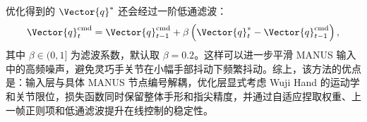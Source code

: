 优化得到的 $\Vector{q}^{*}$ 还会经过一阶低通滤波：
\begin{equation}
    \Vector{q}^{\mathrm{cmd}}_t =
    \Vector{q}^{\mathrm{cmd}}_{t-1}
    +\beta\left(
        \Vector{q}^{*}_t-
        \Vector{q}^{\mathrm{cmd}}_{t-1}
    \right),
\end{equation}
其中 $\beta\in(0,1]$ 为滤波系数，默认取 $\beta=0.2$。这样可以进一步平滑 MANUS 输入中的高频噪声，避免灵巧手关节在小幅手部抖动下频繁抖动。综上，该方法的优点是：输入层与具体 MANUS 节点编号解耦，优化层显式考虑 Wuji Hand 的运动学和关节限位，损失函数同时保留整体手形和指尖精度，并通过自适应捏取权重、上一帧正则项和低通滤波提升在线控制的稳定性。

